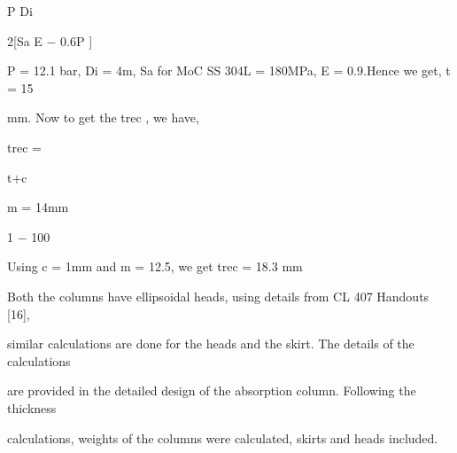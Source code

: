 \documentclass[a4paper,portrait,12pt]{article}
\begin{document}
\begin{flushleft}
P Di
\end{flushleft}


\begin{flushleft}
2[Sa E $-$ 0.6P ]
\end{flushleft}





\begin{flushleft}
P = 12.1 bar, Di = 4m, Sa for MoC SS 304L = 180MPa, E = 0.9.Hence we get, t = 15
\end{flushleft}


\begin{flushleft}
mm. Now to get the trec , we have,
\end{flushleft}


\begin{flushleft}
trec =
\end{flushleft}





\begin{flushleft}
t+c
\end{flushleft}


\begin{flushleft}
m = 14mm
\end{flushleft}


1 $-$ 100





\begin{flushleft}
Using c = 1mm and m = 12.5, we get trec = 18.3 mm
\end{flushleft}


\begin{flushleft}
Both the columns have ellipsoidal heads, using details from CL 407 Handouts [16],
\end{flushleft}


\begin{flushleft}
similar calculations are done for the heads and the skirt. The details of the calculations
\end{flushleft}


\begin{flushleft}
are provided in the detailed design of the absorption column. Following the thickness
\end{flushleft}


\begin{flushleft}
calculations, weights of the columns were calculated, skirts and heads included.
\end{flushleft}
\end{document}
